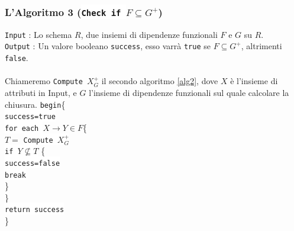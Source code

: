 \documentclass[12pt, letterpaper]{article}
\newcommand{\code}[1]{\colorbox{light-gray}{\texttt{#1}}}
\newcommand{\codee}[1]{\colorbox{white}{\texttt{#1}}}
\newcommand{\acc}{\\\hphantom{}\\}
\begin{document}
\subsubsection{L'Algoritmo 3 (\codee{Check if }\(F\subseteq G^+\))} \label{alg3}
\code{Input} : Lo schema \(R\), due insiemi di dipendenze funzionali \(F\) e \(G\) su \(R\).\\
\code{Output} : Un valore booleano \code{success}, esso varrà \code{true} se \(F\subseteq G^+\), altrimenti \code{false}.\acc
Chiameremo \code{Compute \(X_G^+\)} il secondo algoritmo \ref{alg2}, dove \(X\) è l'insieme di attributi in Input, e \(G\) l'insieme 
di dipendenze funzionali sul quale calcolare la chiusura.\newpage
\hphantom{ident}\codee{begin}\{\\
\hphantom{ident}\hphantom{ident}\codee{success=true}\\
\hphantom{ident}\hphantom{ident}\codee{for each }\(X\rightarrow Y\in F\)\{\\
\hphantom{ident}\hphantom{ident}\hphantom{ident}\(T=\) \codee{Compute \(X_G^+\)}\\
\hphantom{ident}\hphantom{ident}\hphantom{ident}\codee{if \(Y\nsubseteq T\)} \{ \\
\hphantom{ident}\hphantom{ident}\hphantom{ident}\hphantom{ident}\codee{success=false}\\
\hphantom{ident}\hphantom{ident}\hphantom{ident}\hphantom{ident}\codee{break}\\
\hphantom{ident}\hphantom{ident}\hphantom{ident}\}\\
\hphantom{ident}\hphantom{ident}\}\\
\hphantom{ident}\hphantom{ident}\codee{return success}\\
\hphantom{ident}\}
\end{document}
